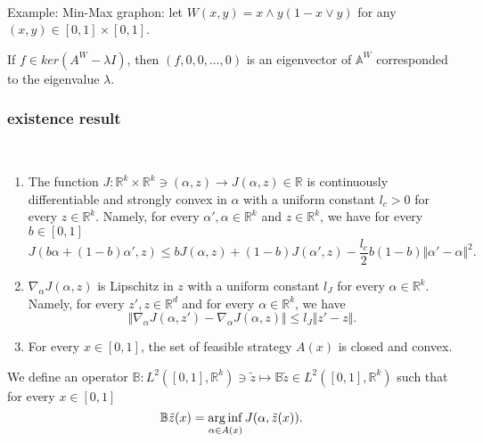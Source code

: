 \ \\
Example: Min-Max graphon: let $W(x,y) = x \wedge y (1- x \vee y)$ for any $(x,y) \in [0,1]\times [0,1]$.


\begin{remark}
	If $f \in ker(A^W - \lambda I)$, then $(f, 0,0,\ldots,0)$ is an eigenvector of $\mathbb{A}^W$ corresponded to the eigenvalue $\lambda$.
\end{remark}


\subsubsection{existence result}

\begin{assumption}\ 
	\begin{enumerate}
		\item The function $J : \mathbb{R}^k \times \mathbb{R}^k \ni (\alpha,z)\to J(\alpha,z) \in \mathbb{R}$ is continuously differentiable and strongly convex in $\alpha$ with a uniform constant $l_c > 0$ for every $z \in \mathbb{R}^k$. Namely, for every $\alpha', \alpha \in \mathbb{R}^k$ and $z \in \mathbb{R}^k$, we have for every $b \in [0,1]$
		$$
			J(b \alpha + (1-b) \alpha' , z) \leq b J(\alpha,z) + (1-b) J(\alpha', z) - \frac{l_c}{2} b (1-b) \Vert \alpha' - \alpha \Vert^2 .
		$$
		\item $\nabla_\alpha J(\alpha, z)$ is Lipschitz in $z$ with a uniform constant $l_J$ for every $\alpha \in \mathbb{R}^k$. Namely, for every $z',z \in \mathbb{R}^d$ and for every $\alpha \in \mathbb{R}^k$, we have
		$$
			\Vert \nabla_\alpha J(\alpha, z') - \nabla_\alpha J(\alpha, z) \Vert \leq l_J \Vert z' - z \Vert.
		$$		
		\item For every $x\in [0,1]$, the set of feasible strategy $A(x)$ is closed and convex. 
	\end{enumerate}
\label{assumption:Garphon_games_1}
\end{assumption}


 
\begin{definition}
	We define an operator $\mathbb{B}: L^2([0,1], \mathbb{R}^k) \ni \tilde{z} \mapsto \mathbb{B}\tilde{z} \in L^2([0,1], \mathbb{R}^k)$ such that  for every $x \in [0,1]$
	$$	
		\mathbb{B}\tilde{z}(x) = \operatorname*{arg\,inf}_{\alpha \in A(x)} J(\alpha, \tilde{z}(x)).
	$$
\end{definition}

